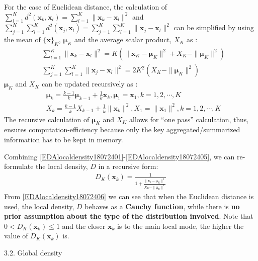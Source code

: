 {For the case of Euclidean distance, the calculation of $\sum^K_{l=1} d^2(\bm x_k,\bm  x_l)=\sum^K_{l=1}\|\bm x_k-\bm  x_l\|^2$ and $\sum^K_{j=1}\sum^K_{l=1} d^2(\bm x_j,\bm  x_l)=\sum^K_{j=1}\sum^K_{l=1}\|\bm x_j-\bm  x_l\|^2 $ can be simplified by using the mean of $\{\bm x\}_K$, $\bm \mu_K$ and the average scalar product, $X_K$ as \cite{Angelov2016-7844219,Angelov2017Empirical}:
\begin{align}
  &\sum^K_{l=1}\|\bm x_k-\bm  x_l\|^2=K(\|\bm x_K-\bm \mu_K\|^2+X_K-\|\bm \mu_K\|^2)\label{EDAlocaldensity18072402}\\
  &\sum^K_{j=1}\sum^K_{l=1}\|\bm x_j-\bm  x_l\|^2 =2K^2(X_K-\|\bm \mu_K\|^2)\label{EDAlocaldensity18072403}
\end{align}
$\bm \mu_K$ and $X_K$ can be updated recursively as \cite{Angelov2012Autonomous}:
\begin{align}
  &\bm \mu_k=\frac {k-1} k \bm \mu_{k-1}+\frac {1} k \bm  x_k, \bm \mu_1=\bm x_1, k=1,2,\cdots, K\label{EDAlocaldensity18072404}\\
  &X_k=\frac {k-1} k X_{k-1}+\frac {1} k \|\bm x_k\|^2, X_1=\|\bm  x_1\|^2, k=1,2,\cdots, K\label{EDAlocaldensity18072405}
\end{align}
The recursive calculation of $\bm \mu_K$ and $X_K$ allows for “one pass” calculation, thus, ensures computation-efficiency because only the key aggregated/summarized information has to be kept in memory.

Combining \eqref{EDAlocaldensity18072401}-\eqref{EDAlocaldensity18072405}, we can re-formulate the local density, $D$ in a recursive form:
\begin{align}\label{EDAlocaldensity18072406}
 D_K(\bm x_k) =\frac 1 {1 + \frac{\|\bm x_k-\bm\mu_K\|^2}{X_K-\|\bm \mu_K\|^2}}
\end{align}
From \eqref{EDAlocaldensity18072406} we can see that when the Euclidean distance is used, the local density, $D$ behaves as a \textbf{Cauchy function}, while there is \textbf{no prior assumption about the type of the distribution involved}. Note that $0 < D_K(\bm x_k) \leq 1$ and the closer $\bm x_k$ is to the main local mode, the higher the value of $D_K(\bm x_k)$ is.

3.2. Global density

}

